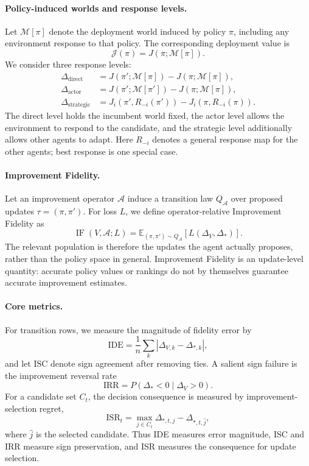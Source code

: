 \documentclass{article}
\newcommand{\E}{\mathbb{E}}
\newcommand{\M}{\mathcal{M}}
\newcommand{\J}{\mathcal{J}}
\newcommand{\pii}{\pi}
\newcommand{\pip}{\pi'}
\begin{document}
\paragraph{Policy-induced worlds and response levels.}
Let $\M[\pi]$ denote the deployment world induced by policy $\pi$, including
any environment response to that policy. The corresponding deployment value is
\begin{equation}
  \J(\pi)=J(\pi;\M[\pi]).
\end{equation}
We consider three response levels:
\begin{align}
 \Delta_{\mathrm{direct}} &= J(\pip;\M[\pii])-J(\pii;\M[\pii]),\\
 \Delta_{\mathrm{actor}} &= J(\pip;\M[\pip])-J(\pii;\M[\pii]),\\
 \Delta_{\mathrm{strategic}} &=
 J_i(\pip,R_{-i}(\pip))-J_i(\pii,R_{-i}(\pii)).
\end{align}
The direct level holds the incumbent world fixed, the actor level allows the
environment to respond to the candidate, and the strategic level additionally
allows other agents to adapt. Here $R_{-i}$ denotes a general response map for
the other agents; best response is one special case.

\paragraph{Improvement Fidelity.}
Let an improvement operator $\mathcal A$ induce a transition law
$Q_{\mathcal A}$ over proposed updates $\tau=(\pi,\pi')$. For loss $L$, we
define operator-relative Improvement Fidelity as
\begin{equation}
  \operatorname{IF}(V,\mathcal A;L)=
  \E_{(\pi,\pi')\sim Q_{\mathcal A}}
  [L(\Delta_V,\Delta_*)].
\end{equation}
The relevant population is therefore the updates the agent actually proposes,
rather than the policy space in general. Improvement Fidelity is an
update-level quantity: accurate policy values or rankings do not by themselves
guarantee accurate improvement estimates.

\paragraph{Core metrics.}
For transition rows, we measure the magnitude of fidelity error by
\begin{equation}
  \mathrm{IDE}=
  \frac{1}{n}\sum_k |\Delta_{V,k}-\Delta_{*,k}|,
\end{equation}
and let $\mathrm{ISC}$ denote sign agreement after removing ties. A salient
sign failure is the improvement reversal rate
\begin{equation}
  \mathrm{IRR}=P(\Delta_*<0\mid\Delta_V>0).
\end{equation}
For a candidate set $C_t$, the decision consequence is measured by
improvement-selection regret,
\begin{equation}
  \mathrm{ISR}_t=
  \max_{j\in C_t}\Delta_{*,t,j}-\Delta_{*,t,\hat j},
\end{equation}
where $\hat j$ is the selected candidate. Thus IDE measures error magnitude,
ISC and IRR measure sign preservation, and ISR measures the consequence for
update selection.
\end{document}
